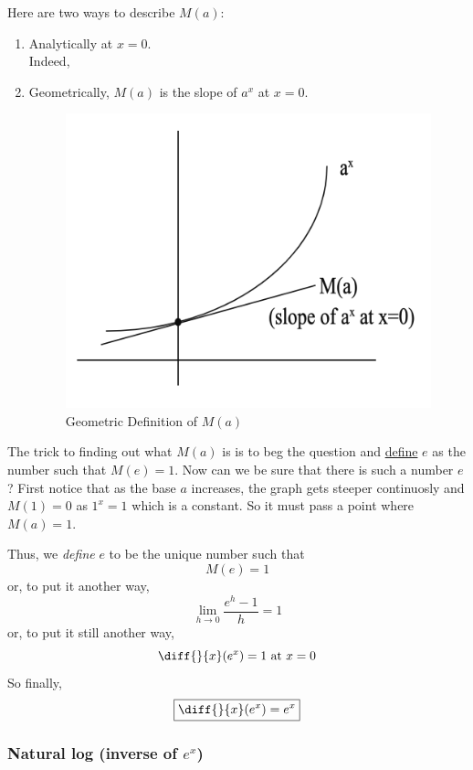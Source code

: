 Here are two ways to describe $M(a)$:
\begin{enumerate}
	\item Analytically  at $x=0$. \\
	Indeed, 
	\item Geometrically, $M(a)$ is the slope of $a^x$ at $x=0$.

	\begin{figure}[ht!]
		\centering
		\includegraphics[scale=0.4]{./images/lecture_6_figure_1.png}
		\caption{Geometric Definition of $M(a)$}
	\end{figure}
\end{enumerate}

The trick to finding out what $M(a)$ is is to beg the question and \underline{define} $e$ as the number such that $M(e) = 1$.
Now can we be sure that there is such a number $e$?
First notice that as the base $a$ increases, the graph gets steeper continuosly and $M(1) = 0$ as $1^x = 1$ which is a constant.
So it must pass a point where $M(a) = 1$.

Thus, we {\it define} $e$ to be the unique number such that $$ M(e) = 1 $$
or, to put it another way, $$ \lim_{h \to 0} \frac{e^h - 1}{h} = 1 $$
or, to put it still another way, $$\diff{}{x} (e^x) = 1 \text{ at } x = 0 $$
So finally, $$\boxed{\diff{}{x}(e^x) = e^x}$$


\subsubsection{Natural log (inverse of $e^x$)}

